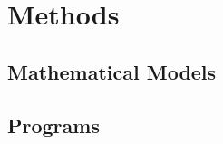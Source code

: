 \chapter{Methods}

\section{Mathematical Models}

\label{sec:models}
\cleardoubleoddpage

\section{Programs}

\label{sec:programs}
\cleardoubleoddpage